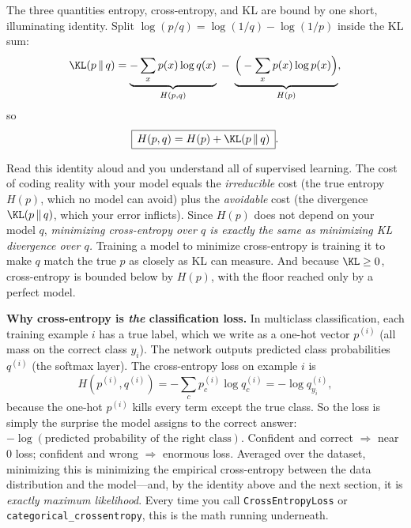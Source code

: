 The three quantities entropy, cross-entropy, and KL are bound by one short, illuminating identity. Split
$\log(p/q) = \log(1/q) - \log(1/p)$ inside the KL sum:
\[
  \KL(p\,\|\,q) = \underbrace{-\sum_x p(x)\log q(x)}_{H(p,q)} \;-\; \underbrace{\Big(-\sum_x p(x)\log p(x)\Big)}_{H(p)},
\]
so
\[
  \boxed{\,H(p, q) = H(p) + \KL(p \,\|\, q)\,}.
\]

\begin{aestheticbox}
Read this identity aloud and you understand all of supervised learning. The cost of coding reality with
your model equals the \emph{irreducible} cost (the true entropy $H(p)$, which no model can avoid) plus the
\emph{avoidable} cost (the divergence $\KL(p\,\|\,q)$, which your error inflicts). Since $H(p)$ does not
depend on your model $q$, \emph{minimizing cross-entropy over $q$ is exactly the same as minimizing KL
divergence over $q$.} Training a model to minimize cross-entropy is training it to make $q$ match the true
$p$ as closely as KL can measure. And because $\KL \ge 0$, cross-entropy is bounded below by $H(p)$, with
the floor reached only by a perfect model.
\end{aestheticbox}

\begin{applicationbox}
\textbf{Why cross-entropy is \emph{the} classification loss.} In multiclass classification, each training
example $i$ has a true label, which we write as a one-hot vector $p^{(i)}$ (all mass on the correct class
$y_i$). The network outputs predicted class probabilities $q^{(i)}$ (the softmax layer). The cross-entropy
loss on example $i$ is
\[
  H(p^{(i)}, q^{(i)}) = -\sum_c p^{(i)}_c \log q^{(i)}_c = -\log q^{(i)}_{y_i},
\]
because the one-hot $p^{(i)}$ kills every term except the true class. So the loss is simply the surprise
the model assigns to the correct answer: $-\log(\text{predicted probability of the right class})$. Confident
and correct $\Rightarrow$ near $0$ loss; confident and wrong $\Rightarrow$ enormous loss. Averaged over the
dataset, minimizing this is minimizing the empirical cross-entropy between the data distribution and the
model---and, by the identity above and the next section, it is \emph{exactly maximum likelihood}. Every
time you call \texttt{CrossEntropyLoss} or \texttt{categorical\_crossentropy}, this is the math running
underneath.
\end{applicationbox}

